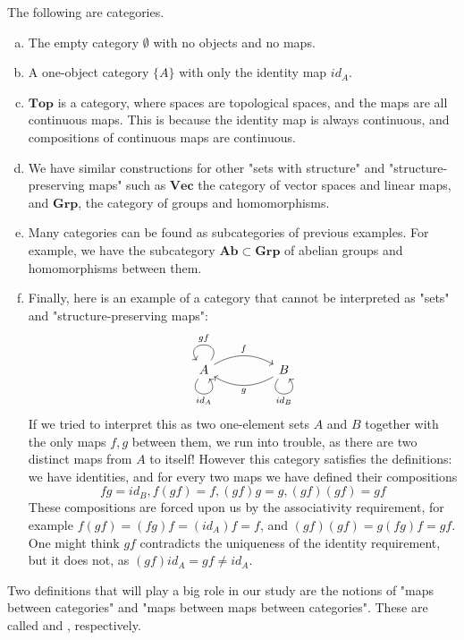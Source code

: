 \begin{example}
The following are categories.
\begin{enumerate}[(a)]

\item The empty category $\emptyset$ with no objects and no maps.
\item A one-object category $\{A\}$ with only the identity map $id_A$.

\item $\mathbf{Top}$ is a category, where spaces are topological spaces, and the maps are all continuous maps. This is because the identity map is always continuous, and compositions of continuous maps are continuous.

\item We have similar constructions for other "sets with structure" and "structure-preserving maps" such as $\mathbf{Vec}$ the category of vector spaces and linear maps, and $\mathbf{Grp}$, the category of groups and homomorphisms.
\item Many categories can be found as subcategories of previous examples. For example, we have the subcategory $\mathbf{Ab}\subset \mathbf{Grp}$ of abelian groups and homomorphisms between them.
\item Finally, here is an example of a category that cannot be interpreted as "sets" and "structure-preserving maps": 
\[\begin{tikzcd}
A \arrow["id_A"', loop, distance=2em, in=305, out=235] \arrow[rr, "f", bend left] \arrow["gf"', loop, distance=2em, in=125, out=55] &  & B \arrow["id_B"', loop, distance=2em, in=305, out=235] \arrow[ll, "g", bend left]
\end{tikzcd}\]
If we tried to interpret this as two one-element sets $A$ and $B$ together with the only maps $f,g$ between them, we run into trouble, as there are two distinct maps from $A$ to itself! However this category satisfies the definitions: we have identities, and for every two maps we have defined their compositions
$$fg=id_B, f(gf)=f,(gf)g=g,(gf)(gf)=gf$$
These compositions are forced upon us by the associativity requirement, for example $f(gf)=(fg)f=(id_A)f=f$, and $(gf)(gf)=g(fg)f=gf$. One might think $gf$ contradicts the uniqueness of the identity requirement, but it does not, as $(gf)id_A=gf\neq id_A$. 

\end{enumerate}\end{example}
\par Two definitions that will play a big role in our study are the notions of "maps between categories" and "maps between maps between categories". These are called  and , respectively.

